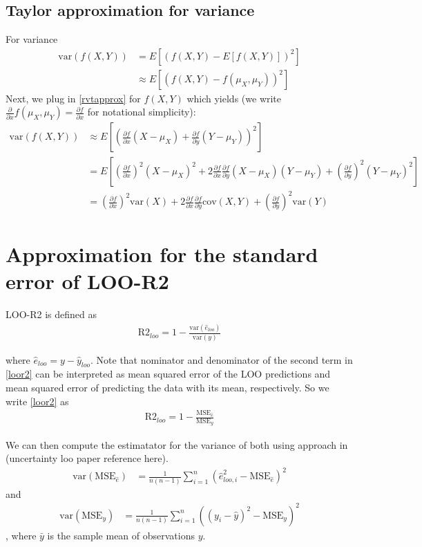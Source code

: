 \documentclass{article}
\begin{document}
\subsection{Taylor approximation for variance}
For variance
\begin{align}
    \text{var}(f(X, Y)) &= E\left[ \left(f(X, Y) - E[f(X,Y)] \right)^2 \right] \nonumber \\
    &\approx E\left[ \left( f(X, Y) - f(\mu_X, \mu_Y) \right)^2 \right] \nonumber
\end{align}
Next, we plug in \eqref{rvtapprox} for $f(X,Y)$ which yields (we write $\frac{\partial }{\partial x} f(\mu_X, \mu_Y) = \frac{\partial f}{\partial x}$ for notational simplicity):
\begin{align}
    \text{var}(f(X, Y)) &\approx E\left[ \left( \frac{\partial f}{\partial x} (X - \mu_X) + \frac{\partial f}{\partial y} (Y - \mu_Y) \right)^2 \right] \nonumber \\
    &= E\left[ \left( \frac{\partial f}{\partial x}  \right)^2 (X - \mu_X)^2 + 2 \frac{\partial f}{\partial x} \frac{\partial f}{\partial y} (X - \mu_X)(Y - \mu_Y) + \left( \frac{\partial f}{\partial y}  \right)^2 (Y - \mu_Y)^2  \right] \nonumber \\
    &= \left( \frac{\partial f}{\partial x}  \right)^2 \text{var}(X) + 2 \frac{\partial f}{\partial x} \frac{\partial f}{\partial y} \text{cov}(X, Y) + \left( \frac{\partial f}{\partial y}  \right)^2 \text{var}(Y) \label{varapprox}
\end{align}

\section{Approximation for the standard error of LOO-R2}
LOO-R2 is defined as
\begin{align}
\text{R2}_{loo} = 1 - \frac{\text{var}(\hat{e}_{loo}) }{ \text{var}(y)} \label{loor2}
\end{align}

where $\hat{e}_{loo} = y - \hat{y}_{loo}$. Note that nominator and denominator of the second term in \eqref{loor2} can be interpreted as mean squared error of the LOO predictions and mean squared error of predicting the data with its mean, respectively. So we write \eqref{loor2} as 
\begin{align}
    \text{R2}_{loo} = 1 - \frac{\text{MSE}_{\hat{e}} }{ \text{MSE}_y} \label{mser2}
\end{align}

We can then compute the estimatator for the variance of both using approach in (uncertainty loo paper reference here).
\begin{align}
    \text{var}(\text{MSE}_{\hat{e}}) &= \frac{1}{n (n-1)} \sum_{i = 1}^n \left( \hat{e}_{loo, i}^2 - \text{MSE}_{\hat{e}} \right)^2 \label{vare}
\end{align}
and
\begin{align}
    \text{var}(\text{MSE}_y) &= \frac{1}{n (n-1)} \sum_{i = 1}^n \left( (y_i - \hat{y})^2 -\text{MSE}_y \right)^2 \label{vary}
\end{align},
where $\bar{y}$ is the sample mean of observations $y$. 
\end{document}
